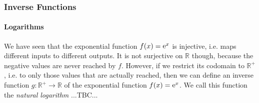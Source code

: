 \subsubsection{Inverse Functions}

\paragraph{Logarithms}
We have seen that the exponential function $f(x) = \operatorname{\mathrm{e}}^x$ is injective, i.e. maps different inputs to different outputs. It is not surjective on $\mathbb{R}$ though, because the negative values are never reached by $f$. However, if we restrict its codomain to $\mathbb{R}^+$, i.e. to only those values that are actually reached, then we can define an inverse function $g: \mathbb{R}^+ \rightarrow \mathbb{R}$ of the exponential function $f(x) = \operatorname{\mathrm{e}}^x$. We call this function the \emph{natural logarithm} ...TBC...









